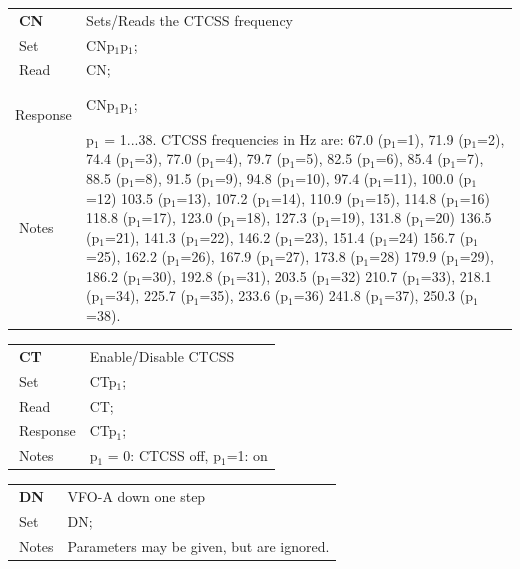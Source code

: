 \documentclass[12pt]{book}
\begin{document}
\begin{center}
\begin{tabular}{|p{2cm}|p{11cm}|}
\toprule
$\phantom{\Big|}$\textbf{\large CN} & Sets/Reads the CTCSS frequency \\\cline{1-2}
$\phantom{\Big|}${\large Set} & {CNp$_1$p$_1$;} \\\hline
$\phantom{\Big|}${\large Read} & {CN;} \\\hline
$\phantom{\Big|}${\large Response} & {CNp$_1$p$_1$;} \\\hline
$\phantom{\Big|}${\large Notes} & \multicolumn{1}{|p{11cm}|}{p$_1$ =  1...38. CTCSS frequencies in Hz are: 67.0 (p$_1$=1),  71.9 (p$_1$=2),  74.4 (p$_1$=3),  77.0 (p$_1$=4), 79.7 (p$_1$=5),  82.5 (p$_1$=6),  85.4 (p$_1$=7),  88.5 (p$_1$=8), 91.5 (p$_1$=9),  94.8 (p$_1$=10), 97.4 (p$_1$=11), 100.0 (p$_1$=12) 103.5 (p$_1$=13), 107.2 (p$_1$=14), 110.9 (p$_1$=15), 114.8 (p$_1$=16) 118.8 (p$_1$=17), 123.0 (p$_1$=18), 127.3 (p$_1$=19), 131.8 (p$_1$=20) 136.5 (p$_1$=21), 141.3 (p$_1$=22), 146.2 (p$_1$=23), 151.4 (p$_1$=24) 156.7 (p$_1$=25), 162.2 (p$_1$=26), 167.9 (p$_1$=27), 173.8 (p$_1$=28) 179.9 (p$_1$=29), 186.2 (p$_1$=30), 192.8 (p$_1$=31), 203.5 (p$_1$=32) 210.7 (p$_1$=33), 218.1 (p$_1$=34), 225.7 (p$_1$=35), 233.6 (p$_1$=36) 241.8 (p$_1$=37), 250.3 (p$_1$=38).} \\
\bottomrule
\end{tabular}
\end{center}

\begin{center}
\begin{tabular}{|p{2cm}|p{11cm}|}
\toprule
$\phantom{\Big|}$\textbf{\large CT} & Enable/Disable CTCSS \\\cline{1-2}
$\phantom{\Big|}${\large Set} & {CTp$_1$;} \\\hline
$\phantom{\Big|}${\large Read} & {CT;} \\\hline
$\phantom{\Big|}${\large Response} & {CTp$_1$;} \\\hline
$\phantom{\Big|}${\large Notes} & \multicolumn{1}{|p{11cm}|}{p$_1$ = 0: CTCSS off, p$_1$=1: on} \\
\bottomrule
\end{tabular}
\end{center}

\begin{center}
\begin{tabular}{|p{2cm}|p{11cm}|}
\toprule
$\phantom{\Big|}$\textbf{\large DN} & VFO-A down  one step \\\cline{1-2}
$\phantom{\Big|}${\large Set} & {DN;} \\\hline
$\phantom{\Big|}${\large Notes} & \multicolumn{1}{|p{11cm}|}{Parameters may be given, but are ignored.} \\
\bottomrule
\end{tabular}
\end{center}
\end{document}
